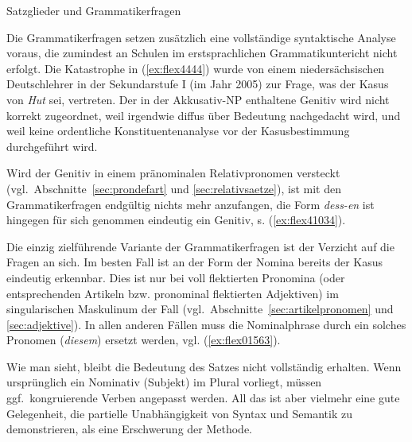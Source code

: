 \begin{Vertiefung}{Satzglieder und Grammatikerfragen}

\noindent Die Grammatikerfragen setzen zusätzlich eine vollständige syntaktische Analyse voraus, die zumindest an Schulen im erstsprachlichen Grammatikuntericht nicht erfolgt.
Die Katastrophe in (\ref{ex:flex4444}) wurde von einem niedersächsischen Deutschlehrer in der Sekundarstufe I (im Jahr 2005) zur Frage, was der Kasus von \textit{Hut} sei, vertreten.
Der in der Akkusativ-NP enthaltene Genitiv wird nicht korrekt zugeordnet, weil irgendwie diffus über Bedeutung nachgedacht wird, und weil keine ordentliche Konstituentenanalyse vor der Kasusbestimmung durchgeführt wird.


\begin{exe}
  \ex \label{ex:flex4444}
  \begin{xlist}
  \end{xlist}
\end{exe}

Wird der Genitiv in einem pränominalen Relativpronomen versteckt (vgl.\ Abschnitte~\ref{sec:prondefart} und \ref{sec:relativsaetze}), ist mit den Grammatikerfragen endgültig nichts mehr anzufangen, die Form \textit{dess-en} ist hingegen für sich genommen eindeutig ein Genitiv, s. (\ref{ex:flex41034}).

\begin{exe}
\end{exe}

Die einzig zielführende Variante der Grammatikerfragen ist der Verzicht auf die Fragen an sich.
Im besten Fall ist an der Form der Nomina bereits der Kasus eindeutig erkennbar.
Dies ist nur bei voll flektierten Pronomina (oder entsprechenden Artikeln bzw. pronominal flektierten Adjektiven) im singularischen Maskulinum der Fall (vgl.\ Abschnitte~\ref{sec:artikelpronomen} und \ref{sec:adjektive}).
In allen anderen Fällen muss die Nominalphrase durch ein solches Pronomen (\zB \textit{diesem}) ersetzt werden, vgl. (\ref{ex:flex01563}).

\begin{exe}
  \ex\label{ex:flex01563} 
  \begin{xlist}
  \end{xlist}
\end{exe}

Wie man sieht, bleibt die Bedeutung des Satzes nicht vollständig erhalten.
Wenn ursprünglich ein Nominativ (Subjekt) im Plural vorliegt, müssen ggf.\ kongruierende Verben angepasst werden.
All das ist aber vielmehr eine gute Gelegenheit, die partielle Unabhängigkeit von Syntax und Semantik zu demonstrieren, als eine Erschwerung der Methode.

\end{Vertiefung}

